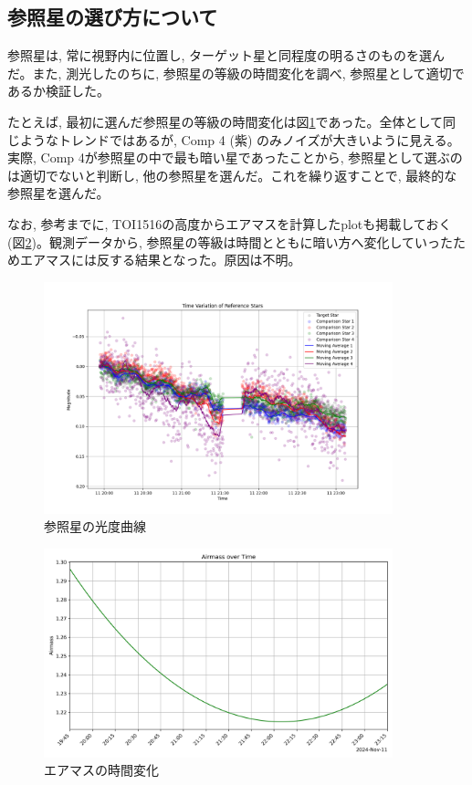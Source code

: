 \documentclass[dvipdfmx,a4paper]{jsarticle}
\begin{document}
\subsection{参照星の選び方について}
参照星は, 常に視野内に位置し, ターゲット星と同程度の明るさのものを選んだ。また, 測光したのちに, 参照星の等級の時間変化を調べ, 参照星として適切であるか検証した。

たとえば, 最初に選んだ参照星の等級の時間変化は図\ref{fig:comp}であった。全体として同じようなトレンドではあるが, Comp 4 (紫) のみノイズが大きいように見える。実際, Comp 4が参照星の中で最も暗い星であったことから, 参照星として選ぶのは適切でないと判断し, 他の参照星を選んだ。これを繰り返すことで, 最終的な参照星を選んだ。

なお, 参考までに, TOI1516の高度からエアマスを計算したplotも掲載しておく (図\ref{fig:airmass})。観測データから, 参照星の等級は時間とともに暗い方へ変化していったためエアマスには反する結果となった。原因は不明。

\begin{figure}[H]
  \centering
  \includegraphics[width=0.9\textwidth]{./fig/light_curve_comp_first.png}
  \caption{参照星の光度曲線}
  \label{fig:comp}
\end{figure}

\begin{figure}[H]
  \centering
  \includegraphics[width=0.9\textwidth]{./fig/airmass_over_time.png}
  \caption{エアマスの時間変化}
  \label{fig:airmass}
\end{figure}
\end{document}
